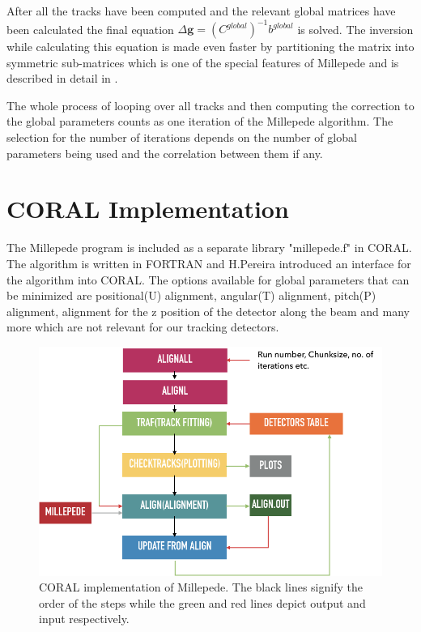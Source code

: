 After all the tracks have been computed and the relevant global matrices have been calculated the final equation $\Delta\textbf{g} = (C^{global})^{-1} b^{global}$ is solved. The inversion while calculating this equation is made even faster by partitioning the matrix into symmetric sub-matrices which is one of the special features of Millepede and is described in detail in \cite{Blobel:2002ax}.

The whole process of looping over all tracks and then computing the correction to the global parameters counts as one iteration of the Millepede algorithm. The selection for the number of iterations depends on the number of global parameters being used and the correlation between them if any.


\section{CORAL Implementation}
The Millepede program is included as a separate library "millepede.f"  in CORAL. The algorithm is written in FORTRAN and H.Pereira \cite{PereiraDaCosta:1204557} introduced an interface for the algorithm into CORAL. The options available for global parameters that can be minimized are positional(U) alignment, angular(T) alignment, pitch(P) alignment, alignment for the z position of the detector along the beam and many more which are not relevant for our tracking detectors.

\begin{figure}[t!]
\centering
\includegraphics[width=\textwidth]{thesis_figures/Millepede_implementation.png}
\caption{ CORAL implementation of Millepede. The black lines signify the order of the steps while the green and red lines depict output and input respectively.}
\label{fig:millepede_implementation}
\end{figure}


